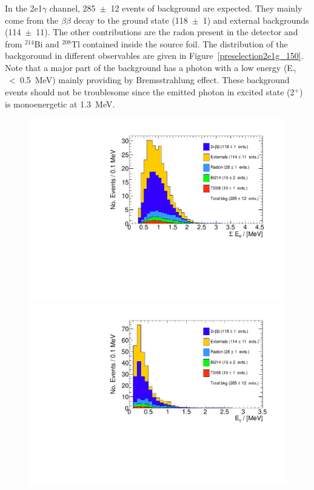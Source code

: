 \documentclass[main.tex]{subfiles}
\begin{document}
\NI In the 2e1$\gamma$ channel, 285~$\pm$~12 events of background are expected. They mainly come from the $\beta\beta$ decay to the ground state (118~$\pm$~1) and external backgrounds (114~$\pm$~11). The other contributions are the radon present in the detector and from $^{\text{214}}$Bi and $^{\text{208}}$Tl contained inside the source foil. The distribution of the backgoround in different observables are given in Figure~\ref{preselection2e1g_150}. Note that a major part of the background has a photon with a low energy (E$_\gamma$~<~0.5~MeV) mainly providing by Bremsstrahlung effect. These background events should not be troublesome since the emitted photon in excited state (2$^+$) is monoenergetic at 1.3~MeV. 


\begin{figure}[h!]
\centering
\includegraphics[scale=0.35]{pictures/FinalResults/bb2nu2/150/preselection/preSelection2e1gBKG_tot_e_energy.pdf}
\includegraphics[scale=0.35]{pictures/FinalResults/bb2nu2/150/preselection/preSelection2e1gBKG_gmc_energy.pdf}

\end{figure}
\end{document}
